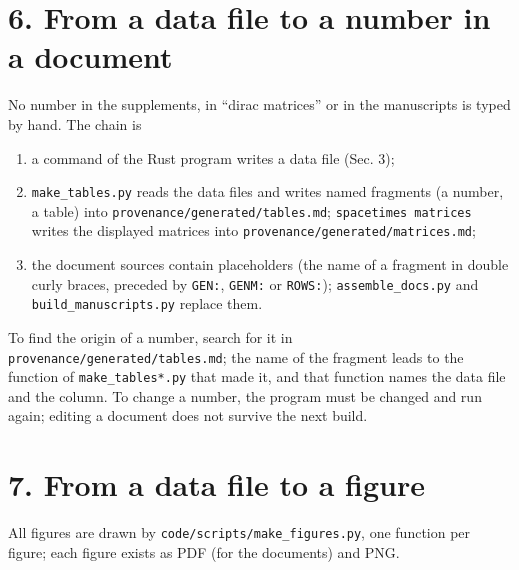 \documentclass[
  10pt,
]{article}
\providecommand{\tightlist}{%
  \setlength{\itemsep}{0pt}\setlength{\parskip}{0pt}}
\begin{document}
\hypertarget{from-a-data-file-to-a-number-in-a-document}{%
\section{6. From a data file to a number in a
document}\label{from-a-data-file-to-a-number-in-a-document}}

No number in the supplements, in ``dirac matrices'' or in the
manuscripts is typed by hand. The chain is

\begin{enumerate}
\def\labelenumi{\arabic{enumi}.}
\tightlist
\item
  a command of the Rust program writes a data file (Sec. 3);
\item
  \texttt{make\_tables.py} reads the data files and writes named
  fragments (a number, a table) into
  \texttt{provenance/generated/tables.md}; \texttt{spacetimes\ matrices}
  writes the displayed matrices into
  \texttt{provenance/generated/matrices.md};
\item
  the document sources contain placeholders (the name of a fragment in
  double curly braces, preceded by \texttt{GEN:}, \texttt{GENM:} or
  \texttt{ROWS:}); \texttt{assemble\_docs.py} and
  \texttt{build\_manuscripts.py} replace them.
\end{enumerate}

To find the origin of a number, search for it in
\texttt{provenance/generated/tables.md}; the name of the fragment leads
to the function of \texttt{make\_tables*.py} that made it, and that
function names the data file and the column. To change a number, the
program must be changed and run again; editing a document does not
survive the next build.

\hypertarget{from-a-data-file-to-a-figure}{%
\section{7. From a data file to a
figure}\label{from-a-data-file-to-a-figure}}

All figures are drawn by \texttt{code/scripts/make\_figures.py}, one
function per figure; each figure exists as PDF (for the documents) and
PNG.
\end{document}
